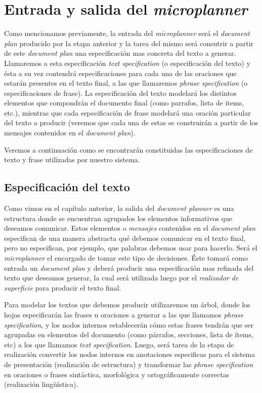 \section{Entrada y salida del \textit{microplanner}}
Como mencionamos previamente, la entrada del \textit{microplanner} será el \textit{document plan} producido por la etapa anterior y la tarea del mismo será consutrir a partir de este \textit{document plan} una especificación mas concreta del texto a generar. Llamaremos a esta especificación \textit{text specification} (o especificación del texto) y ésta a su vez contendrá especificaciones para cada una de las oraciones que estarán presentes en el texto final, a las que llamaremos \textit{phrase specification} (o especificaciones de frase). La especificación del texto modelará los distintos elementos que compondrán el documento final (como parrafos, lista de items, etc.), mientras que cada especificación de frase modelará una oración particular del texto a producir (veremos que cada una de estas se construirán a partir de los mensajes contenidos en el \textit{document plan}). 

Veremos a continuación como se encontrarán constituidas las especificaciones de texto y frase utilizadas por nuestro sistema.

\subsection{Especificación del texto}

Como vimos en el capítulo anterior, la salida del  \textit{document planner} es una estructura donde se encuentran agrupados los elementos informativos que deseamos comunicar. Estos elementos o \emph{mensajes} contenidos en el \emph{document plan} especifican de una manera abstracta qué debemos comunicar en el texto final, pero no especifican, por ejemplo, que palabras debemos usar para hacerlo. Será el \textit{microplanner} el encargado de tomar este tipo de decisiones. Éste tomará como entrada un \textit{document plan} y deberá producir una especificación mas refinada del texto que deseamos generar, la cual será utilizada luego por el \emph{realizador de superficie} para producir el texto final.

Para modelar los textos que debemos producir utilizaremos un árbol, donde los hojas especificarán las frases u oraciones a generar a las que llamamos \emph{phrase specification}, y los nodos internos establecerán cómo estas frases tendrán que ser agrupadas en elementos del documento (como párrafos, secciones, lista de ítems, etc) a los que llamamos \emph{text specification}. Luego, será tarea de la etapa de realización convertir los nodos internos en anotaciones especificas para el sistema de presentación (realización de estructura) y transformar las \emph{phrase specification} en oraciones o frases sintáctica, morfológica y ortográficamente correctas (realización lingüística).

